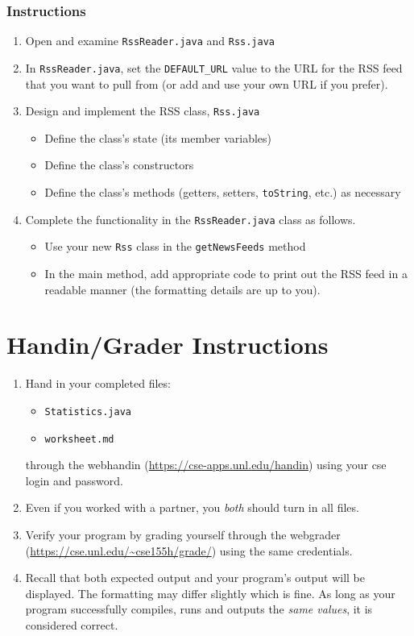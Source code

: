 \documentclass[12pt]{scrartcl}
\begin{document}
\subsubsection*{Instructions}

\begin{enumerate}
  \item Open and examine \texttt{RssReader.java} and \texttt{Rss.java} 
  \item In \texttt{RssReader.java}, set the \texttt{DEFAULT_URL} 
  	value to the URL for the RSS feed that you want to pull from 
	(or add and use your own URL if you prefer).
  \item Design and implement the RSS class, \texttt{Rss.java}
  \begin{itemize}
    \item Define the class's state (its member variables)
    \item Define the class's constructors
    \item Define the class's methods (getters, setters, \texttt{toString}, etc.) as necessary
  \end{itemize}
  \item Complete the functionality in the \texttt{RssReader.java} class as follows.
  \begin{itemize}
    \item Use your new \texttt{Rss} class in the \texttt{getNewsFeeds} method 
    \item In the main method, add appropriate code to print out the RSS feed in 
    	a readable manner (the formatting details are up to you).  
  \end{itemize}
\end{enumerate}

\section{Handin/Grader Instructions}

\begin{enumerate}
  \item Hand in your completed files:
    \begin{itemize}
    \item \texttt{Statistics.java}
    \item \texttt{worksheet.md}
  \end{itemize}
  through the webhandin (\url{https://cse-apps.unl.edu/handin}) 
  using your cse login and password.  
  \item Even if you worked with a partner, you \emph{both} should
  turn in all files.
  \item Verify your program by grading yourself through the
  webgrader (\url{https://cse.unl.edu/~cse155h/grade/}) using the
  same credentials.
  \item Recall that both expected output and your program's output
  will be displayed.  The formatting may differ slightly which is fine.
  As long as your program successfully compiles, runs and outputs 
  the \emph{same values}, it is considered correct.
\end{enumerate}
\end{document}
